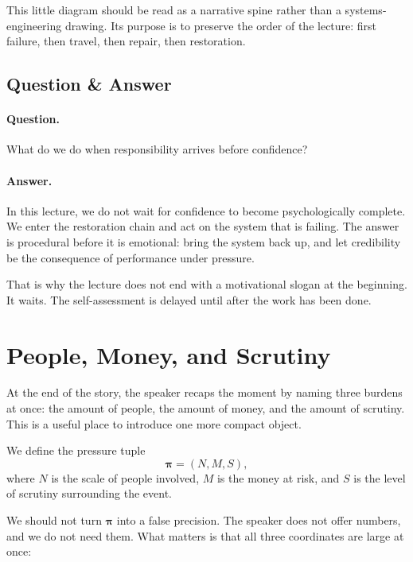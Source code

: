 This little diagram should be read as a narrative spine rather than a systems-engineering drawing. Its purpose is to preserve the order of the lecture: first failure, then travel, then repair, then restoration.

\subsection{Question \& Answer}

\paragraph{Question.} What do we do when responsibility arrives before confidence?

\paragraph{Answer.} In this lecture, we do not wait for confidence to become psychologically complete. We enter the restoration chain and act on the system that is failing. The answer is procedural before it is emotional: bring the system back up, and let credibility be the consequence of performance under pressure.

That is why the lecture does not end with a motivational slogan at the beginning. It waits. The self-assessment is delayed until after the work has been done.

\section{People, Money, and Scrutiny}

At the end of the story, the speaker recaps the moment by naming three burdens at once: the amount of people, the amount of money, and the amount of scrutiny. This is a useful place to introduce one more compact object.

\begin{definition}
We define the pressure tuple
\begin{equation}
\boldsymbol{\pi}=(N,M,S),
\end{equation}
where \(N\) is the scale of people involved, \(M\) is the money at risk, and \(S\) is the level of scrutiny surrounding the event.
\end{definition}

We should not turn \(\boldsymbol{\pi}\) into a false precision. The speaker does not offer numbers, and we do not need them. What matters is that all three coordinates are large at once:

